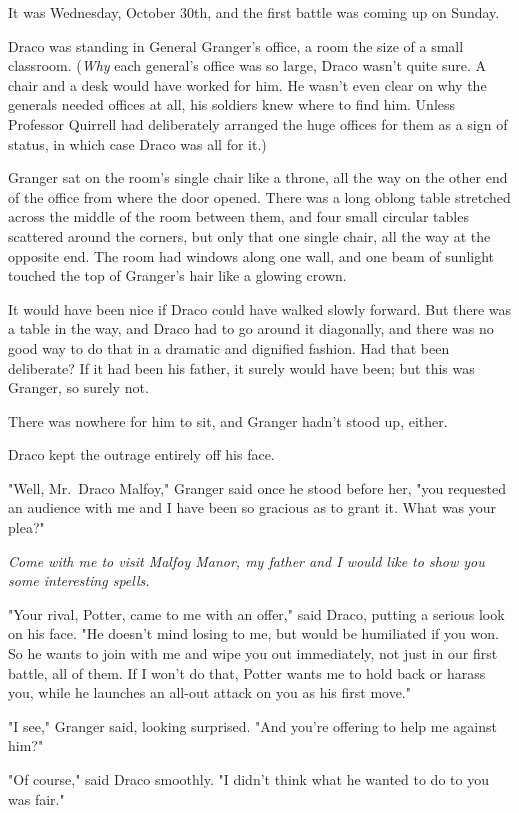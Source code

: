 It was Wednesday, October 30th, and the first battle was coming up on Sunday.

Draco was standing in General Granger's office, a room the size of a small
classroom. (\emph{Why} each general's office was so large, Draco wasn't quite
sure. A chair and a desk would have worked for him. He wasn't even clear on why
the generals needed offices at all, his soldiers knew where to find him. Unless
Professor Quirrell had deliberately arranged the huge offices for them as a
sign of status, in which case Draco was all for it.)

Granger sat on the room's single chair like a throne, all the way on the other
end of the office from where the door opened. There was a long oblong table
stretched across the middle of the room between them, and four small circular
tables scattered around the corners, but only that one single chair, all the
way at the opposite end. The room had windows along one wall, and one beam of
sunlight touched the top of Granger's hair like a glowing crown.

It would have been nice if Draco could have walked slowly forward. But there
was a table in the way, and Draco had to go around it diagonally, and there was
no good way to do that in a dramatic and dignified fashion. Had that been
deliberate? If it had been his father, it surely would have been; but this was
Granger, so surely not.

There was nowhere for him to sit, and Granger hadn't stood up, either.

Draco kept the outrage entirely off his face.

"Well, Mr.~Draco Malfoy," Granger said once he stood before her, "you requested
an audience with me and I have been so gracious as to grant it. What was your
plea?"

\emph{Come with me to visit Malfoy Manor, my father and I would like to show
you some interesting spells.}

"Your rival, Potter, came to me with an offer," said Draco, putting a serious
look on his face. "He doesn't mind losing to me, but would be humiliated if you
won. So he wants to join with me and wipe you out immediately, not just in our
first battle, all of them. If I won't do that, Potter wants me to hold back or
harass you, while he launches an all-out attack on you as his first move."

"I see," Granger said, looking surprised. "And you're offering to help me
against him?"

"Of course," said Draco smoothly. "I didn't think what he wanted to do to you
was fair."


